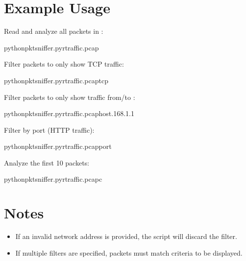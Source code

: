 \documentclass[letterpaper,10pt,english]{sphinxmanual}
\begin{document}
\section{Example Usage}
\label{\detokenize{packet_sniffer_doc:example-usage}}
\sphinxAtStartPar
Read and analyze all packets in :

\begin{sphinxVerbatim}[commandchars=\\\{\}]
pythonpktsniffer.py\PYGZhy{}rtraffic.pcap
\end{sphinxVerbatim}

\sphinxAtStartPar
Filter packets to only show TCP traffic:

\begin{sphinxVerbatim}[commandchars=\\\{\}]
pythonpktsniffer.py\PYGZhy{}rtraffic.pcap\PYGZhy{}tcp
\end{sphinxVerbatim}

\sphinxAtStartPar
Filter packets to only show traffic from/to :

\begin{sphinxVerbatim}[commandchars=\\\{\}]
pythonpktsniffer.py\PYGZhy{}rtraffic.pcap\PYGZhy{}host.168.1.1
\end{sphinxVerbatim}

\sphinxAtStartPar
Filter by port  (HTTP traffic):

\begin{sphinxVerbatim}[commandchars=\\\{\}]
pythonpktsniffer.py\PYGZhy{}rtraffic.pcap\PYGZhy{}port
\end{sphinxVerbatim}

\sphinxAtStartPar
Analyze the first 10 packets:

\begin{sphinxVerbatim}[commandchars=\\\{\}]
pythonpktsniffer.py\PYGZhy{}rtraffic.pcap\PYGZhy{}c
\end{sphinxVerbatim}


\section{Notes}
\label{\detokenize{packet_sniffer_doc:notes}}\begin{itemize}
\item {} 
\sphinxAtStartPar
If an invalid network address is provided, the script will discard the filter.

\item {} 
\sphinxAtStartPar
If multiple filters are specified, packets must match  criteria to be displayed.

\end{itemize}
\end{document}
